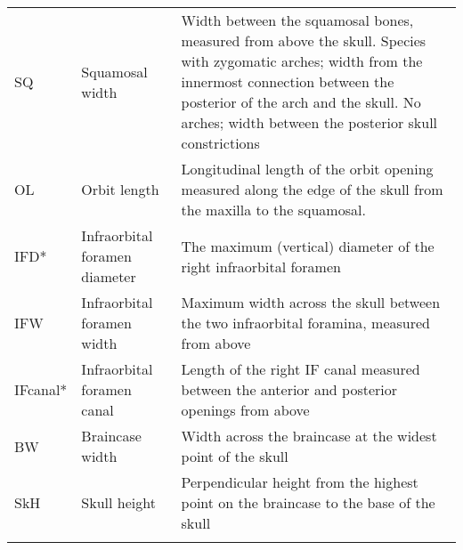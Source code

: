\begin{center}
\begin{longtable} {p{} p{} p{}}
SQ & Squamosal width & Width between the squamosal bones, measured from above the skull. Species with zygomatic arches; width from the innermost connection between the posterior of the arch and the skull. No arches; width between the posterior skull constrictions \\
OL & Orbit length & Longitudinal length of the orbit opening measured along the edge of the skull from the maxilla to the squamosal. \\
IFD* & Infraorbital foramen diameter & The maximum (vertical) diameter of the right infraorbital foramen\\
IFW & Infraorbital foramen width & Maximum width across the skull between the two infraorbital foramina, measured from above\\
IFcanal* & Infraorbital foramen canal & Length of the right IF canal measured between the anterior and posterior openings from above\\
BW & Braincase width & Width across the braincase at the widest point of the skull\\
SkH & Skull height & Perpendicular height from the highest point on the braincase to the base of the skull\\
\hline
\label{tab:sk.measurements}

\end{longtable}
\end{center}
\newpage
